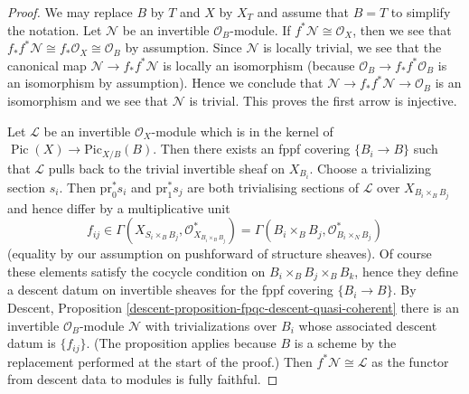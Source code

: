 \documentclass{stacks-project}
\theoremstyle{plain}
\theoremstyle{definition}
\theoremstyle{remark}
\numberwithin{equation}{subsection}
\def\Pic{\mathop{\mathrm{Pic}}\nolimits}
\def\Picardfunctor{\mathrm{Pic}}
\begin{document}
\begin{proof}
We may replace $B$ by $T$ and $X$ by $X_T$ and assume that $B = T$
to simplify the notation. Let $\mathcal{N}$ be an invertible
$\mathcal{O}_B$-module. If $f^*\mathcal{N} \cong \mathcal{O}_X$, then
we see that $f_*f^*\mathcal{N} \cong f_*\mathcal{O}_X \cong \mathcal{O}_B$
by assumption. Since $\mathcal{N}$ is locally trivial, we see that
the canonical map $\mathcal{N} \to f_*f^*\mathcal{N}$ is locally
an isomorphism (because $\mathcal{O}_B \to f_*f^*\mathcal{O}_B$
is an isomorphism by assumption). Hence we conclude that
$\mathcal{N} \to f_*f^*\mathcal{N} \to \mathcal{O}_B$ is an isomorphism
and we see that $\mathcal{N}$ is trivial. This proves the first arrow
is injective.

\medskip\noindent
Let $\mathcal{L}$ be an invertible $\mathcal{O}_X$-module which is in
the kernel of $\Pic(X) \to \Picardfunctor_{X/B}(B)$. Then there exists
an fppf covering $\{B_i \to B\}$ such that $\mathcal{L}$ pulls back
to the trivial invertible sheaf on $X_{B_i}$. Choose a trivializing
section $s_i$. Then $\text{pr}_0^*s_i$ and $\text{pr}_1^*s_j$ are both
trivialising sections of $\mathcal{L}$ over $X_{B_i \times_B B_j}$
and hence differ by a multiplicative unit
$$
f_{ij} \in
\Gamma(X_{S_i \times_B B_j}, \mathcal{O}_{X_{B_i \times_B B_j}}^*) =
\Gamma(B_i \times_B B_j, \mathcal{O}_{B_i \times_N B_j}^*)
$$
(equality by our assumption on pushforward of structure sheaves).
Of course these elements satisfy the cocycle condition on
$B_i \times_B B_j \times_B B_k$, hence they define a descent datum
on invertible sheaves for the fppf covering $\{B_i \to B\}$.
By Descent, Proposition \ref{descent-proposition-fpqc-descent-quasi-coherent}
there is an invertible $\mathcal{O}_B$-module $\mathcal{N}$
with trivializations over $B_i$ whose associated descent datum is
$\{f_{ij}\}$. (The proposition applies because $B$ is a scheme
by the replacement performed at the start of the proof.)
Then $f^*\mathcal{N} \cong \mathcal{L}$ as the
functor from descent data to modules is fully faithful.
\end{proof}
\end{document}
